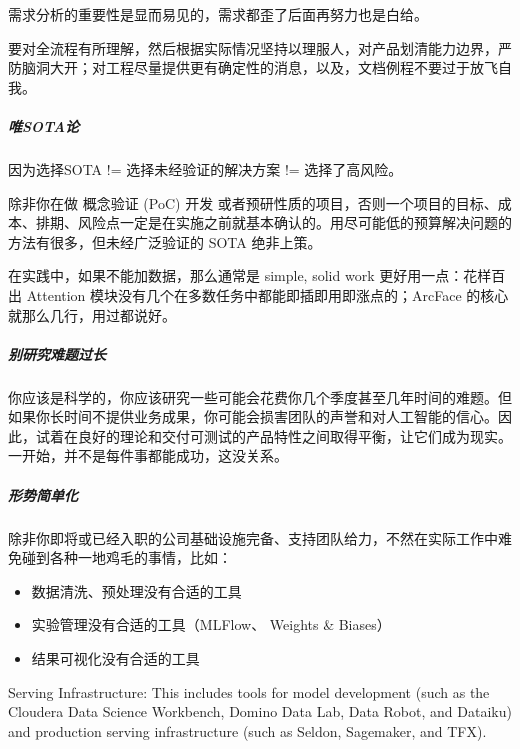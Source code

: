 \documentclass[letterpaper,11pt,english]{sphinxmanual}
\begin{document}
需求分析的重要性是显而易见的，需求都歪了后面再努力也是白给。

要对全流程有所理解，然后根据实际情况坚持以理服人，对产品划清能力边界，严防脑洞大开；对工程尽量提供更有确定性的消息，以及，文档例程不要过于放飞自我。


\subparagraph{唯SOTA论}
\label{\detokenize{chapter_introduction/AI_PM:sota}}
因为选择SOTA != 选择未经验证的解决方案 != 选择了高风险。

除非你在做 概念验证 (PoC) 开发
或者预研性质的项目，否则一个项目的目标、成本、排期、风险点一定是在实施之前就基本确认的。用尽可能低的预算解决问题的方法有很多，但未经广泛验证的
SOTA 绝非上策。

在实践中，如果不能加数据，那么通常是 simple, solid work
更好用一点：花样百出 Attention
模块没有几个在多数任务中都能即插即用即涨点的；ArcFace
的核心就那么几行，用过都说好。


\subparagraph{别研究难题过长}
\label{\detokenize{chapter_introduction/AI_PM:id31}}
你应该是科学的，你应该研究一些可能会花费你几个季度甚至几年时间的难题。但如果你长时间不提供业务成果，你可能会损害团队的声誉和对人工智能的信心。因此，试着在良好的理论和交付可测试的产品特性之间取得平衡，让它们成为现实。一开始，并不是每件事都能成功，这没关系。


\subparagraph{形势简单化}
\label{\detokenize{chapter_introduction/AI_PM:id32}}
除非你即将或已经入职的公司基础设施完备、支持团队给力，不然在实际工作中难免碰到各种一地鸡毛的事情，比如：
\begin{itemize}
\item {} 
数据清洗、预处理没有合适的工具

\item {} 
实验管理没有合适的工具（MLFlow、 Weights \& Biases）

\item {} 
结果可视化没有合适的工具

\end{itemize}

Serving Infrastructure: This includes tools for model development (such
as the Cloudera Data Science Workbench, Domino Data Lab, Data Robot, and
Dataiku) and production serving infrastructure (such as Seldon,
Sagemaker, and TFX).
%
\begin{footnote}[256]\sphinxAtStartFootnote
{}
%
\end{footnote}
\end{document}
